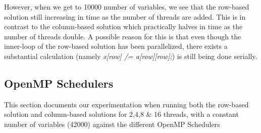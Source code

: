     However, when we get to 10000 number of variables, we see that the row-based solution still increasing in time as the number of threads are added.
    This is in contrast to the column-based solution which practically halves in time as the number of threads double.
    A possible reason for this is that even though the inner-loop of the row-based solution has been parallelized, there exists a substantial calculation (namely \textit{x[row] /= a[row][row];})
    is still being done serially.

\subsection{OpenMP Schedulers}
  This section documents our experimentation when running both the row-based solution and column-based solutions for 2,4,8 & 16 threads, with a constant number of variables (42000) 
  against the different OpenMP Schedulers

  